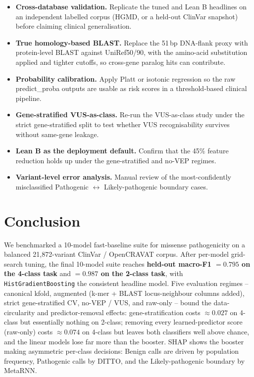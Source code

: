 \documentclass[11pt,a4paper]{article}
\begin{document}
\begin{itemize}[leftmargin=*]
 \item \textbf{Cross-database validation.} Replicate the tuned and Lean B headlines on an independent labelled corpus (HGMD, or a held-out ClinVar snapshot) before claiming clinical generalisation.
 \item \textbf{True homology-based BLAST.} Replace the 51\,bp DNA-flank proxy with protein-level BLAST against UniRef50/90, with the amino-acid substitution applied and tighter cutoffs, so cross-gene paralog hits can contribute.
 \item \textbf{Probability calibration.} Apply Platt or isotonic regression so the raw predict\_proba outputs are usable as risk scores in a threshold-based clinical pipeline.
 \item \textbf{Gene-stratified VUS-as-class.} Re-run the VUS-as-class study under the strict gene-stratified split to test whether VUS recognisability survives without same-gene leakage.
 \item \textbf{Lean B as the deployment default.} Confirm that the 45\% feature reduction holds up under the gene-stratified and no-VEP regimes.
 \item \textbf{Variant-level error analysis.} Manual review of the most-confidently misclassified Pathogenic $\leftrightarrow$ Likely-pathogenic boundary cases.
\end{itemize}

\section{Conclusion}

We benchmarked a 10-model fast-baseline suite for missense pathogenicity on
a balanced 21{,}872-variant ClinVar / OpenCRAVAT corpus. After per-model
grid-search tuning, the final 10-model
suite reaches \textbf{held-out macro-F1 $=0.795$ on the 4-class task} and
\textbf{$=0.987$ on the 2-class task}, with \texttt{HistGradientBoosting}
the consistent headline model. Five evaluation regimes -- canonical kfold,
augmented (k-mer + BLAST locus-neighbour columns added), strict
gene-stratified CV, no-VEP / VUS, and raw-only -- bound the data-circularity
and predictor-removal effects: gene-stratification costs $\approx 0.027$ on
4-class but essentially nothing on 2-class; removing every learned-predictor
score (raw-only) costs $\approx 0.074$ on 4-class but leaves both classifiers
well above chance, and the linear models lose far more than the booster.
SHAP shows the booster making asymmetric per-class decisions: Benign calls
are driven by population frequency, Pathogenic calls by DITTO, and the
Likely-pathogenic boundary by MetaRNN.
\end{document}
